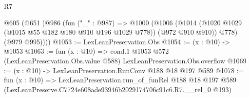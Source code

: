 \begin{lexlean}{R7}
\begin{coremodule}
  @605
    (@651
      (@986
        (fun ("_" : @987) =>
        @1000
          (@1006
            (@1014 (@1020 @1029 (@1015 @55 @182 @180 @910 @196 @1029 @778)) (@972 @910 @910))
            @778)
          (@979 @995))))
@1053 := LexLeanPreservation.Obs
@1054 := (x : @10) -> @1053
@1063 := fun (x : @10) =>
  cond.{1} @1053 @572 (LexLeanPreservation.Obs.value @588) LexLeanPreservation.Obs.overflow
@1069 := (x : @10) -> LexLeanPreservation.RunConv @188 @18 @197 @589
@1078 := fun (x : @10) =>
  LexLeanPreservation.run_of_funRel
    @188
    @18
    @197
    @589
    (LexLeanPreserve.C7724e608ade93946b2029174706c91c6.R7.__rel_0 @193)
\end{coremodule}
\end{lexlean}
